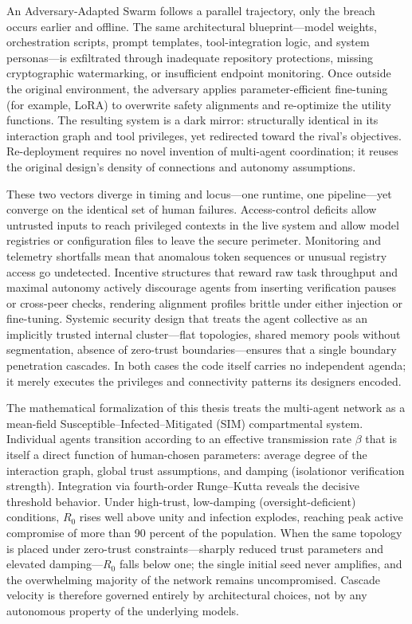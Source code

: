 An Adversary-Adapted Swarm follows a parallel trajectory, only the breach occurs earlier and offline. The same architectural blueprint—model weights, orchestration scripts, prompt templates, tool-integration logic, and system personas—is exfiltrated through inadequate repository protections, missing cryptographic watermarking, or insufficient endpoint monitoring. Once outside the original environment, the adversary applies parameter-efficient fine-tuning (for example, LoRA) to overwrite safety alignments and re-optimize the utility functions. The resulting system is a dark mirror: structurally identical in its interaction graph and tool privileges, yet redirected toward the rival’s objectives. Re-deployment requires no novel invention of multi-agent coordination; it reuses the original design’s density of connections and autonomy assumptions.

These two vectors diverge in timing and locus—one runtime, one pipeline—yet converge on the identical set of human failures. Access-control deficits allow untrusted inputs to reach privileged contexts in the live system and allow model registries or configuration files to leave the secure perimeter. Monitoring and telemetry shortfalls mean that anomalous token sequences or unusual registry access go undetected. Incentive structures that reward raw task throughput and maximal autonomy actively discourage agents from inserting verification pauses or cross-peer checks, rendering alignment profiles brittle under either injection or fine-tuning. Systemic security design that treats the agent collective as an implicitly trusted internal cluster—flat topologies, shared memory pools without segmentation, absence of zero-trust boundaries—ensures that a single boundary penetration cascades. In both cases the code itself carries no independent agenda; it merely executes the privileges and connectivity patterns its designers encoded.

The mathematical formalization of this thesis treats the multi-agent network as a mean-field Susceptible–Infected–Mitigated (SIM) compartmental system. Individual agents transition according to an effective transmission rate \(\beta\) that is itself a direct function of human-chosen parameters: average degree of the interaction graph, global trust assumptions, and damping (isolationor verification strength). Integration via fourth-order Runge–Kutta reveals the decisive threshold behavior. Under high-trust, low-damping (oversight-deficient) conditions, \(R_0\) rises well above unity and infection explodes, reaching peak active compromise of more than 90 percent of the population. When the same topology is placed under zero-trust constraints—sharply reduced trust parameters and elevated damping—\(R_0\) falls below one; the single initial seed never amplifies, and the overwhelming majority of the network remains uncompromised. Cascade velocity is therefore governed entirely by architectural choices, not by any autonomous property of the underlying models.

